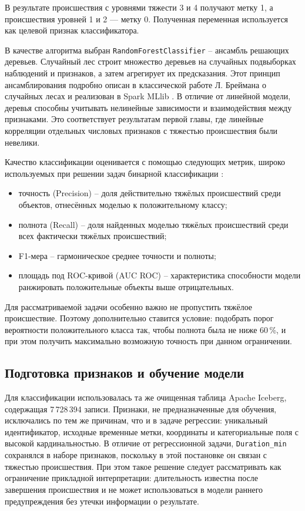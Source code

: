 В результате происшествия с уровнями тяжести 3 и 4 получают метку 1, а происшествия уровней 1 и 2 — метку 0. Полученная переменная используется как целевой признак классификатора.

В качестве алгоритма выбран \texttt{RandomForestClassifier} -- ансамбль решающих деревьев. Случайный лес строит множество деревьев на случайных подвыборках наблюдений и признаков, а затем агрегирует их предсказания. Этот принцип ансамблирования подробно описан в классической работе Л. Бреймана о случайных лесах и реализован в Spark MLlib \cite{breiman2001random, spark352mllib}. В отличие от линейной модели, деревья способны учитывать нелинейные зависимости и взаимодействия между признаками. Это соответствует результатам первой главы, где линейные корреляции отдельных числовых признаков с тяжестью происшествия были невелики.

Качество классификации оценивается с помощью следующих метрик, широко используемых при решении задач бинарной классификации \cite{yandex2024ml, spark352mllib}:
\begin{itemize}
    \item точность (Precision) -- доля действительно тяжёлых происшествий среди объектов, отнесённых моделью к положительному классу;
    \item полнота (Recall) -- доля найденных моделью тяжёлых происшествий среди всех фактически тяжёлых происшествий;
    \item F1-мера -- гармоническое среднее точности и полноты;
    \item площадь под ROC-кривой (AUC ROC) -- характеристика способности модели ранжировать положительные объекты выше отрицательных.
\end{itemize}

Для рассматриваемой задачи особенно важно не пропустить тяжёлое происшествие. Поэтому дополнительно ставится условие: подобрать порог вероятности положительного класса так, чтобы полнота была не ниже 60\,\%, и при этом получить максимально возможную точность при данном ограничении.

\vspace{\baselineskip}\subsection{Подготовка признаков и обучение модели}\vspace{\baselineskip}

Для классификации использовалась та же очищенная таблица Apache Iceberg, содержащая 7\,728\,394 записи. Признаки, не предназначенные для обучения, исключались по тем же причинам, что и в задаче регрессии: уникальный идентификатор, исходные временные метки, координаты и категориальные поля с высокой кардинальностью. В отличие от регрессионной задачи, \texttt{Duration\_min} сохранялся в наборе признаков, поскольку в этой постановке он связан с тяжестью происшествия. При этом такое решение следует рассматривать как ограничение прикладной интерпретации: длительность известна после завершения происшествия и не может использоваться в модели раннего предупреждения без утечки информации о результате.

